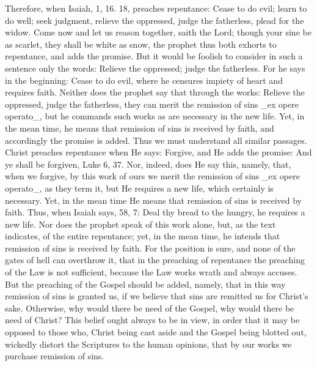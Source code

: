 Therefore, when Isaiah, 1, 16. 18, preaches repentance: Cease to do
evil; learn to do well; seek judgment, relieve the oppressed, judge
the fatherless, plead for the widow.  Come now and let us reason
together, saith the Lord; though your sine be as scarlet, they shall
be white as snow, the prophet thus both exhorts to repentance, and
adds the promise.  But it would be foolish to consider in such a
sentence only the words: Relieve the oppressed; judge the fatherless.
For he says in the beginning: Cease to do evil, where he censures
impiety of heart and requires faith.  Neither does the prophet say
that through the works: Relieve the oppressed, judge the fatherless,
they can merit the remission of sins _ex opere operato_, but he
commands such works as are necessary in the new life.  Yet, in the
mean time, he means that remission of sins is received by faith, and
accordingly the promise is added.  Thus we must understand all
similar passages.  Christ preaches repentance when He says: Forgive,
and He adds the promise: And ye shall be forgiven, Luke 6, 37. Nor,
indeed, does He say this, namely, that, when we forgive, by this work
of ours we merit the remission of sins _ex opere operato_, as they
term it, but He requires a new life, which certainly is necessary.
Yet, in the mean time He means that remission of sins is received by
faith.  Thus, when Isaiah says, 58, 7: Deal thy bread to the hungry,
he requires a new life.  Nor does the prophet speak of this work
alone, but, as the text indicates, of the entire repentance; yet, in
the mean time, he intends that remission of sins is received by faith.
For the position is sure, and none of the gates of hell can
overthrow it, that in the preaching of repentance the preaching of
the Law is not sufficient, because the Law works wrath and always
accuses.  But the preaching of the Gospel should be added, namely,
that in this way remission of sins is granted us, if we believe that
sins are remitted us for Christ's sake.  Otherwise, why would there
be need of the Gospel, why would there be need of Christ?  This
belief ought always to be in view, in order that it may be opposed to
those who, Christ being cast aside and the Gospel being blotted out,
wickedly distort the Scriptures to the human opinions, that by our
works we purchase remission of sins.

